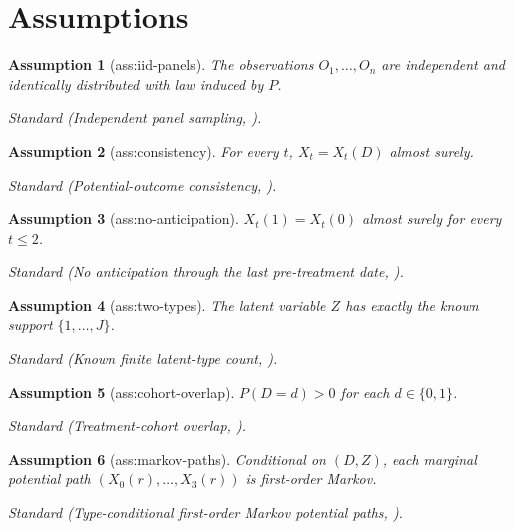 \documentclass{article}
\newtheorem{assumption}{Assumption}
\begin{document}
\section{Assumptions}

\begin{assumption}[ass:iid-panels]\label{ass:iid-panels}
The observations \(O_1,\ldots,O_n\) are independent and identically distributed with law induced by \(P\).
\par\smallskip\noindent\emph{Standard} (Independent panel sampling, \cite{AhnKasahara2026TransitionIndependence}).
\end{assumption}

\begin{assumption}[ass:consistency]\label{ass:consistency}
For every \(t\), \(X_t=X_t(D)\) almost surely.
\par\smallskip\noindent\emph{Standard} (Potential-outcome consistency, \cite{AhnKasahara2026TransitionIndependence}).
\end{assumption}

\begin{assumption}[ass:no-anticipation]\label{ass:no-anticipation}
\(X_t(1)=X_t(0)\) almost surely for every \(t\leq2\).
\par\smallskip\noindent\emph{Standard} (No anticipation through the last pre-treatment date, \cite{AhnKasahara2026TransitionIndependence}).
\end{assumption}

\begin{assumption}[ass:two-types]\label{ass:two-types}
The latent variable \(Z\) has exactly the known support \(\{1,\ldots,J\}\).
\par\smallskip\noindent\emph{Standard} (Known finite latent-type count, \cite{HigginsJochmans2023MixturesDDC}).
\end{assumption}

\begin{assumption}[ass:cohort-overlap]\label{ass:cohort-overlap}
\(P(D=d)>0\) for each \(d\in\{0,1\}\).
\par\smallskip\noindent\emph{Standard} (Treatment-cohort overlap, \cite{AhnKasahara2026TransitionIndependence}).
\end{assumption}

\begin{assumption}[ass:markov-paths]\label{ass:markov-paths}
Conditional on \((D,Z)\), each marginal potential path \((X_0(r),\ldots,X_3(r))\) is first-order Markov.
\par\smallskip\noindent\emph{Standard} (Type-conditional first-order Markov potential paths, \cite{AhnKasahara2026TransitionIndependence}).
\end{assumption}
\end{document}
